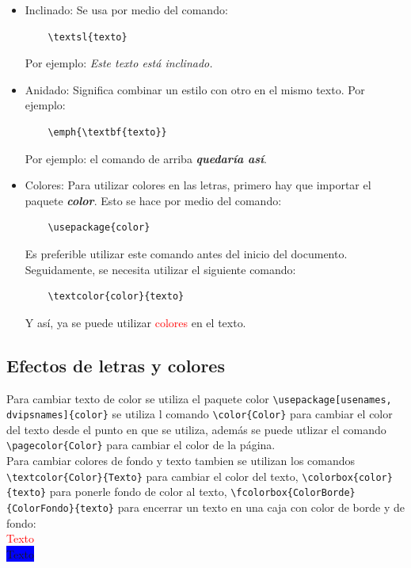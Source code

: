 \documentclass[10pt,journal,compsoc]{IEEEtran}
\begin{document}
\begin{itemize}
	\item Inclinado: Se usa por medio del comando: \\
	\begin{lstlisting}
	\textsl{texto}
	\end{lstlisting}
	Por ejemplo: \textsl{Este texto est\'a inclinado.}
	\item Anidado: Significa combinar un estilo con otro en el mismo texto. Por ejemplo: \\
	\begin{lstlisting}
	\emph{\textbf{texto}}
	\end{lstlisting}
	Por ejemplo: el comando de arriba \emph{\textbf{quedar\'ia as\'i}}.
	
	\item Colores: Para utilizar colores en las letras, primero hay que importar el paquete \textit{\textbf{color}}. Esto se hace por medio del comando: \\
	\begin{lstlisting}
	\usepackage{color}
	\end{lstlisting}
	Es preferible utilizar este comando antes del inicio del documento.
	Seguidamente, se necesita utilizar el siguiente comando: \\
	\begin{lstlisting}
	\textcolor{color}{texto}
	\end{lstlisting}
	Y as\'i, ya se puede utilizar \textcolor{red}{colores} en el texto.
	
\end{itemize}

\subsection{Efectos de letras y colores}
Para cambiar texto de color se utiliza el paquete color \verb|\usepackage[usenames, dvipsnames]{color}| se utiliza l comando \verb|\color{Color}| para cambiar el color del texto desde el punto en que se utiliza, adem\'as se puede utlizar el comando \verb|\pagecolor{Color}| para cambiar el color de la p\'agina.\\
Para cambiar colores de fondo y texto tambien se utilizan los comandos \verb|\textcolor{Color}{Texto}| para cambiar el color del texto, \verb|\colorbox{color}{texto}| para ponerle fondo de color al texto, \verb|\fcolorbox{ColorBorde}{ColorFondo}{texto}| para encerrar un texto en una caja con color de borde y de fondo:\\
\textcolor{red}{Texto}\\\newline
\colorbox{blue}{Texto}\\\newline
{}\\\newline
\end{document}
